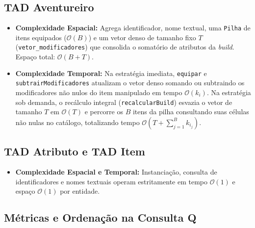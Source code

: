 \documentclass[letterpaper]{article}
\begin{document}
\subsection{TAD Aventureiro}
\begin{itemize}
    \item \textbf{Complexidade Espacial:} Agrega identificador, nome textual, uma \texttt{Pilha} de itens equipados ($\mathcal{O}(B)$) e um vetor denso de tamanho fixo $T$ (\texttt{vetor\_modificadores}) que consolida o somatório de atributos da \textit{build}. Espaço total: $\mathcal{O}(B + T)$.
    \item \textbf{Complexidade Temporal:} Na estratégia imediata, \texttt{equipar} e \texttt{subtrairModificadores} atualizam o vetor denso somando ou subtraindo os modificadores não nulos do item manipulado em tempo $\mathcal{O}(k_i)$. Na estratégia sob demanda, o recálculo integral (\texttt{recalcularBuild}) esvazia o vetor de tamanho $T$ em $\mathcal{O}(T)$ e percorre os $B$ itens da pilha consultando suas células não nulas no catálogo, totalizando tempo $\mathcal{O}(T + \sum_{j=1}^B k_{i_j})$.
\end{itemize}

\subsection{TAD Atributo e TAD Item}
\begin{itemize}
    \item \textbf{Complexidade Espacial e Temporal:} Instanciação, consulta de identificadores e nomes textuais operam estritamente em tempo $\mathcal{O}(1)$ e espaço $\mathcal{O}(1)$ por entidade.
\end{itemize}

\subsection{Métricas e Ordenação na Consulta Q}
\end{document}
